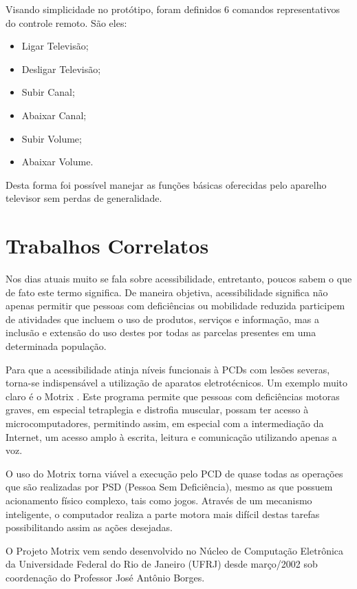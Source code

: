 \documentclass[12pt,a4paper,oneside]{report}
\begin{document}
Visando simplicidade no protótipo, foram definidos 6 comandos representativos do controle remoto. São eles:
\begin{itemize}
    \item Ligar Televisão;
    \item Desligar Televisão;
    \item Subir Canal;
    \item Abaixar Canal;
    \item Subir Volume;
    \item Abaixar Volume.
\end{itemize}

Desta forma foi possível manejar as funções básicas oferecidas pelo aparelho televisor sem perdas de generalidade.

\chapter{Trabalhos Correlatos}
\label{chap:trabalhos-correlatos}

Nos dias atuais muito se fala sobre acessibilidade, entretanto, poucos sabem o que de fato este termo significa. De maneira objetiva, acessibilidade significa não apenas permitir que pessoas com deficiências ou mobilidade reduzida participem de atividades que incluem o uso de produtos, serviços e informação, mas a inclusão e extensão do uso destes por todas as parcelas presentes em uma determinada população.

Para que a acessibilidade atinja níveis funcionais à PCDs com lesões severas, torna-se indispensável a utilização de aparatos eletrotécnicos. Um exemplo muito claro é o Motrix \cite{motrix}. Este programa permite que pessoas com deficiências motoras graves, em especial tetraplegia e distrofia muscular, possam ter acesso à microcomputadores, permitindo assim, em especial com a intermediação da Internet, um acesso amplo à escrita, leitura e comunicação utilizando apenas a voz.

O uso do Motrix torna viável a execução pelo PCD de quase todas as operações que são realizadas por PSD (Pessoa Sem Deficiência), mesmo as que possuem acionamento físico complexo, tais como jogos. Através de um mecanismo inteligente, o computador realiza a parte motora mais difícil destas tarefas possibilitando assim as ações desejadas.

O Projeto Motrix vem sendo desenvolvido no Núcleo de Computação Eletrônica da Universidade Federal do Rio de Janeiro (UFRJ) desde março/2002 sob coordenação do Professor José Antônio Borges.
\end{document}
